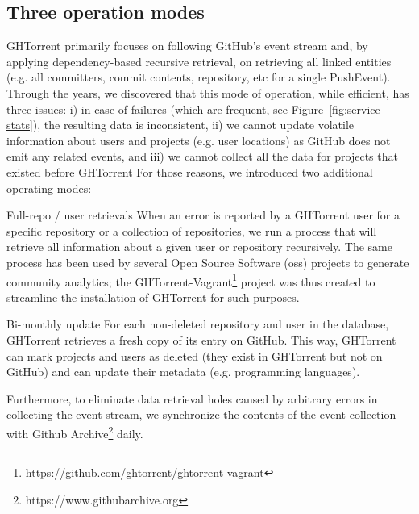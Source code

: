 \documentclass{sig-alternate}
\begin{document}
\subsection{Three operation modes}

GHTorrent primarily focuses on following GitHub's event stream and, by applying
dependency-based recursive retrieval, on retrieving all linked entities (e.g.  all
committers, commit contents, repository, etc for a single PushEvent).
Through the years, we discovered that this mode of operation, while efficient,
has three issues: i) in case of failures (which are frequent, see
Figure~\ref{fig:service-stats}), the resulting data is inconsistent,
ii) we cannot update volatile information about users and projects (e.g. user
locations) as GitHub does not emit any related events, and
iii) we cannot collect all the data for projects that existed before GHTorrent
For those reasons, we introduced two additional operating modes:

\begin{compactdesc}

  \item[Full-repo / user retrievals] When an error is reported by a GHTorrent
    user for a specific repository or a collection of repositories, we run a
    process that will retrieve all information about a given user or repository
    recursively. The same process has been used by several Open Source Software
    ({\sc oss}) projects to generate community analytics; the
    GHTorrent-Vagrant\footnote{https://github.com/ghtorrent/ghtorrent-vagrant}
    project was thus created to streamline the installation of GHTorrent for
    such purposes.

  \item[Bi-monthly update] For each non-deleted repository and user in the
    database, GHTorrent retrieves a fresh copy of its entry on GitHub. This way,
    GHTorrent can mark projects and users as deleted (they exist in GHTorrent
    but not on GitHub) and can update their metadata (e.g. programming
    languages).

\end{compactdesc}

Furthermore, to eliminate data retrieval holes caused by arbitrary errors in
collecting the event stream, we synchronize the contents of the event collection
with Github Archive\footnote{https://www.githubarchive.org} daily.
\end{document}
